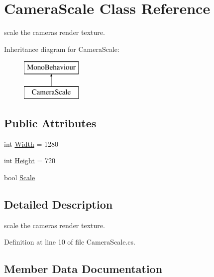 \hypertarget{class_camera_scale}{}\section{Camera\+Scale Class Reference}
\label{class_camera_scale}


scale the camera\textquotesingle{}s render texture.  


Inheritance diagram for Camera\+Scale\+:\begin{figure}[H]
\begin{center}
\leavevmode
\includegraphics[height=2.000000cm]{class_camera_scale}
\end{center}
\end{figure}
\subsection*{Public Attributes}
\begin{DoxyCompactItemize}
\item 
int \mbox{\hyperlink{class_camera_scale_a1be66b77eebaac3edf0a60a36f9c11bb}{Width}} = 1280
\item 
int \mbox{\hyperlink{class_camera_scale_a330382f726a6ab4d6cf96f9cbb0cd5e4}{Height}} = 720
\item 
bool \mbox{\hyperlink{class_camera_scale_ae681f399c01532bc1509c03996794a79}{Scale}}
\end{DoxyCompactItemize}


\subsection{Detailed Description}
scale the camera\textquotesingle{}s render texture. 



Definition at line 10 of file Camera\+Scale.\+cs.



\subsection{Member Data Documentation}
\mbox{\label{class_camera_scale_a330382f726a6ab4d6cf96f9cbb0cd5e4}} 
